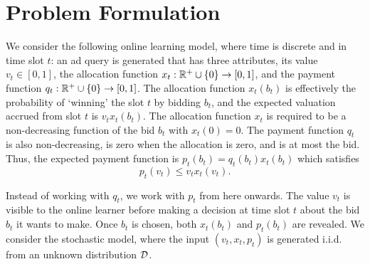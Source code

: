 \section{Problem Formulation}
We consider the following online learning model, where time is discrete and in time slot $t$: an ad query is generated that has three attributes, its value $v_t \in [0,1]$,  the allocation function $x_t: {\mathbb{R}}^+ \cup \{0\} \rightarrow [0,1]$, and the payment function $q_t: {\mathbb{R}}^+ \cup \{0\}\rightarrow [0,1]$. 
The allocation function $x_t(b_t)$ is effectively the probability of `winning' the slot $t$ by bidding $b_t$, and the expected valuation accrued from slot $t$ is $v_t x_t(b_t)$. The allocation function $x_t$ is required to be a non-decreasing function of the bid $b_t$ with $x_t(0) =0$. The payment function $q_t$   is also non-decreasing, is zero when the allocation is zero, and is at most the bid. Thus, the expected payment function is $p_t(b_t)= q_t(b_t)x_t(b_t)$ which satisfies
 \begin{equation}\label{eq:paymentcondition}
p_t(v_t) \le v_t x_t(v_t).
\end{equation}


Instead of working with $q_t$, we work with $p_t$ from here onwards.
The value $v_t$ is visible to the online learner before making a decision at time slot $t$ about the bid $b_t$ it wants to make. Once $b_t$ is chosen, both $x_t(b_t)$ and $p_t(b_t)$ are revealed. 
We consider the stochastic model, where the input $(v_t,x_t,p_t)$ is generated i.i.d. from an unknown distribution $\mathcal{D}$. 



